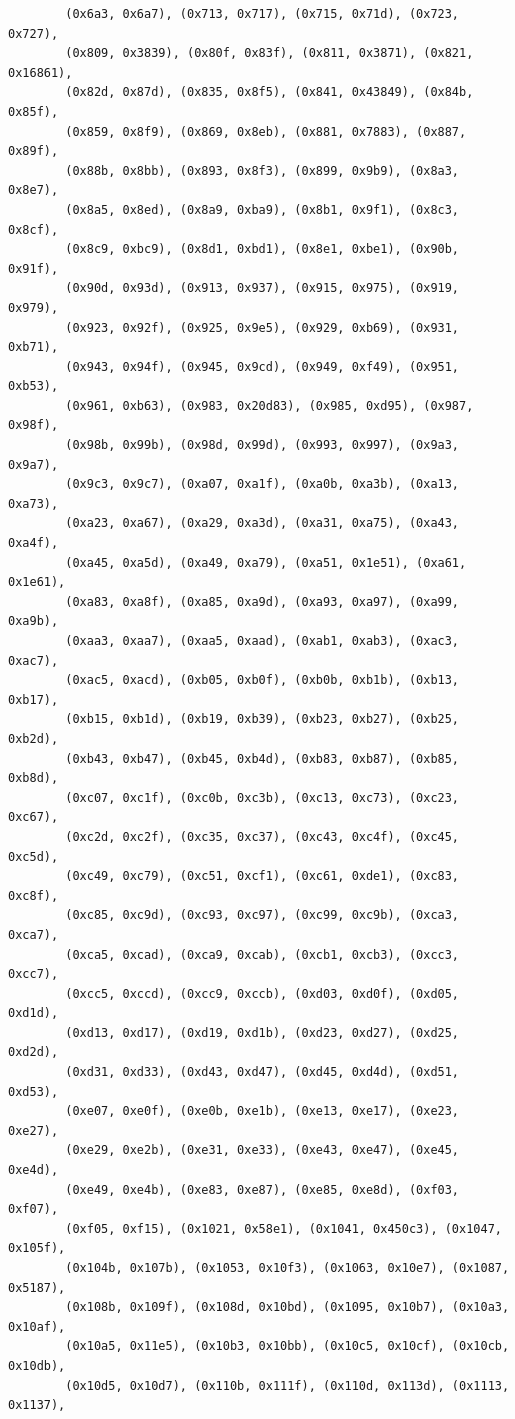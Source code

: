 \documentclass[11pt,a4paper]{article}
\begin{document}
\begin{lstlisting}
        (0x6a3, 0x6a7), (0x713, 0x717), (0x715, 0x71d), (0x723, 0x727),
        (0x809, 0x3839), (0x80f, 0x83f), (0x811, 0x3871), (0x821, 0x16861),
        (0x82d, 0x87d), (0x835, 0x8f5), (0x841, 0x43849), (0x84b, 0x85f),
        (0x859, 0x8f9), (0x869, 0x8eb), (0x881, 0x7883), (0x887, 0x89f),
        (0x88b, 0x8bb), (0x893, 0x8f3), (0x899, 0x9b9), (0x8a3, 0x8e7),
        (0x8a5, 0x8ed), (0x8a9, 0xba9), (0x8b1, 0x9f1), (0x8c3, 0x8cf),
        (0x8c9, 0xbc9), (0x8d1, 0xbd1), (0x8e1, 0xbe1), (0x90b, 0x91f),
        (0x90d, 0x93d), (0x913, 0x937), (0x915, 0x975), (0x919, 0x979),
        (0x923, 0x92f), (0x925, 0x9e5), (0x929, 0xb69), (0x931, 0xb71),
        (0x943, 0x94f), (0x945, 0x9cd), (0x949, 0xf49), (0x951, 0xb53),
        (0x961, 0xb63), (0x983, 0x20d83), (0x985, 0xd95), (0x987, 0x98f),
        (0x98b, 0x99b), (0x98d, 0x99d), (0x993, 0x997), (0x9a3, 0x9a7),
        (0x9c3, 0x9c7), (0xa07, 0xa1f), (0xa0b, 0xa3b), (0xa13, 0xa73),
        (0xa23, 0xa67), (0xa29, 0xa3d), (0xa31, 0xa75), (0xa43, 0xa4f),
        (0xa45, 0xa5d), (0xa49, 0xa79), (0xa51, 0x1e51), (0xa61, 0x1e61),
        (0xa83, 0xa8f), (0xa85, 0xa9d), (0xa93, 0xa97), (0xa99, 0xa9b),
        (0xaa3, 0xaa7), (0xaa5, 0xaad), (0xab1, 0xab3), (0xac3, 0xac7),
        (0xac5, 0xacd), (0xb05, 0xb0f), (0xb0b, 0xb1b), (0xb13, 0xb17),
        (0xb15, 0xb1d), (0xb19, 0xb39), (0xb23, 0xb27), (0xb25, 0xb2d),
        (0xb43, 0xb47), (0xb45, 0xb4d), (0xb83, 0xb87), (0xb85, 0xb8d),
        (0xc07, 0xc1f), (0xc0b, 0xc3b), (0xc13, 0xc73), (0xc23, 0xc67),
        (0xc2d, 0xc2f), (0xc35, 0xc37), (0xc43, 0xc4f), (0xc45, 0xc5d),
        (0xc49, 0xc79), (0xc51, 0xcf1), (0xc61, 0xde1), (0xc83, 0xc8f),
        (0xc85, 0xc9d), (0xc93, 0xc97), (0xc99, 0xc9b), (0xca3, 0xca7),
        (0xca5, 0xcad), (0xca9, 0xcab), (0xcb1, 0xcb3), (0xcc3, 0xcc7),
        (0xcc5, 0xccd), (0xcc9, 0xccb), (0xd03, 0xd0f), (0xd05, 0xd1d),
        (0xd13, 0xd17), (0xd19, 0xd1b), (0xd23, 0xd27), (0xd25, 0xd2d),
        (0xd31, 0xd33), (0xd43, 0xd47), (0xd45, 0xd4d), (0xd51, 0xd53),
        (0xe07, 0xe0f), (0xe0b, 0xe1b), (0xe13, 0xe17), (0xe23, 0xe27),
        (0xe29, 0xe2b), (0xe31, 0xe33), (0xe43, 0xe47), (0xe45, 0xe4d),
        (0xe49, 0xe4b), (0xe83, 0xe87), (0xe85, 0xe8d), (0xf03, 0xf07),
        (0xf05, 0xf15), (0x1021, 0x58e1), (0x1041, 0x450c3), (0x1047, 0x105f),
        (0x104b, 0x107b), (0x1053, 0x10f3), (0x1063, 0x10e7), (0x1087, 0x5187),
        (0x108b, 0x109f), (0x108d, 0x10bd), (0x1095, 0x10b7), (0x10a3, 0x10af),
        (0x10a5, 0x11e5), (0x10b3, 0x10bb), (0x10c5, 0x10cf), (0x10cb, 0x10db),
        (0x10d5, 0x10d7), (0x110b, 0x111f), (0x110d, 0x113d), (0x1113, 0x1137),

\end{lstlisting}
\end{document}

